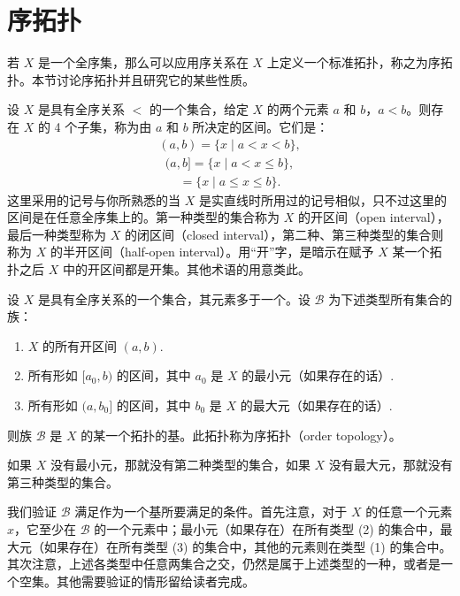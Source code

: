 \documentclass[../../main.tex]{subfiles}
\begin{document}
\section{序拓扑}\label{section:ch02-序拓扑}

若 $X$ 是一个全序集，那么可以应用序关系在 $X$ 上定义一个标准拓扑，称之为序拓扑。本节讨论序拓扑并且研究它的某些性质。

设 $X$ 是具有全序关系 $<$ 的一个集合，给定 $X$ 的两个元素 $a$ 和 $b$，$a < b$。则存在 $X$ 的 4 个子集，称为由 $a$ 和 $b$ 所决定的区间。它们是：
\begin{align*}
(a, b) = \{x \mid a < x < b\},
\end{align*}
\begin{align*}
(a, b] = \{x \mid a < x \leqslant b\},
\end{align*}
\begin{align*}
[a, b) = \{x \mid a \leqslant x < b\},
\end{align*}
\begin{align*}
[a, b] = \{x \mid a \leqslant x \leqslant b\}.
\end{align*}
这里采用的记号与你所熟悉的当 $X$ 是实直线时所用过的记号相似，只不过这里的区间是在任意全序集上的。第一种类型的集合称为 $X$ 的开区间（open interval），最后一种类型称为 $X$ 的闭区间（closed interval），第二种、第三种类型的集合则称为 $X$ 的半开区间（half-open interval）。用“开”字，是暗示在赋予 $X$ 某一个拓扑之后 $X$ 中的开区间都是开集。其他术语的用意类此。

\begin{definition}[序拓扑]\label{definition:ch02-序拓扑}
设 $X$ 是具有全序关系的一个集合，其元素多于一个。设 $\mathcal{B}$ 为下述类型所有集合的族：
\begin{enumerate}[(1)]
\item $X$ 的所有开区间 $(a, b)$.
\item 所有形如 $[a_{0}, b)$ 的区间，其中 $a_{0}$ 是 $X$ 的最小元（如果存在的话）.
\item 所有形如 $(a, b_{0}]$ 的区间，其中 $b_{0}$ 是 $X$ 的最大元（如果存在的话）.
\end{enumerate}
则族 $\mathcal{B}$ 是 $X$ 的某一个拓扑的基。此拓扑称为序拓扑（order topology）。

如果 $X$ 没有最小元，那就没有第二种类型的集合，如果 $X$ 没有最大元，那就没有第三种类型的集合。
\end{definition}

我们验证 $\mathcal{B}$ 满足作为一个基所要满足的条件。首先注意，对于 $X$ 的任意一个元素 $x$，它至少在 $\mathcal{B}$ 的一个元素中；最小元（如果存在）在所有类型 (2) 的集合中，最大元（如果存在）在所有类型 (3) 的集合中，其他的元素则在类型 (1) 的集合中。其次注意，上述各类型中任意两集合之交，仍然是属于上述类型的一种，或者是一个空集。其他需要验证的情形留给读者完成。
\end{document}

